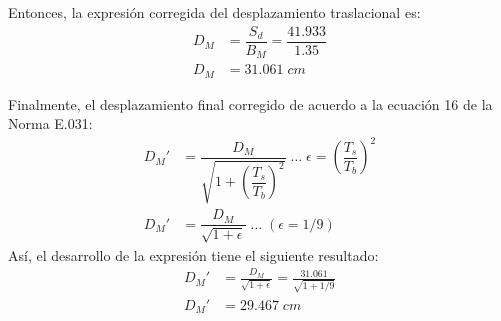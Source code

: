\begin{itemize}
    {\noindent Entonces, la expresión corregida del desplazamiento traslacional es:}
    \begin{align*}
        D_M &= \dfrac{S_d}{B_M} = \dfrac{41.933}{1.35} \\[3pt]
        D_M &= 31.061 \; cm
    \end{align*}

    {\noindent Finalmente, el desplazamiento final corregido de acuerdo a la ecuación 16 de la Norma E.031\supercite{E031.3}}:
    \begin{align}
        D_M' &= \dfrac{D_M}{\sqrt{1 + \left(\dfrac{T_s}{T_b}\right)^2}} \; \ldots \; \epsilon = \left(\dfrac{T_s}{T_b}\right)^2 \nonumber \\[6pt]
        D_M' &= \dfrac{D_M}{\sqrt{1 + \epsilon}} \; \ldots \; ( \epsilon = 1/9) \label{eq1_4}
    \end{align}
    {\noindent Así, el desarrollo de la expresión tiene el siguiente resultado:}
    \begin{align*}
        D_M' &= \frac{D_M}{\sqrt{1 + \epsilon}} = \frac{31.061}{\sqrt{1 + 1/9}} \\[3pt] 
        D_M' &= 29.467 \; cm
    \end{align*}
    \end{itemize}
    
